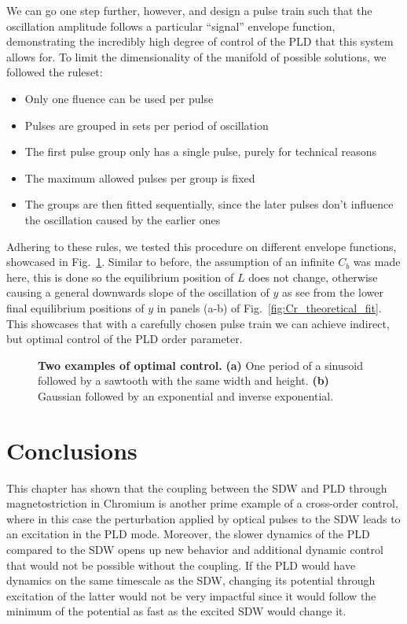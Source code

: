 We can go one step further, however, and design a pulse train such that the oscillation amplitude follows a particular ``signal'' envelope function, demonstrating the incredibly high degree of control of the PLD that this system allows for.  
To limit the dimensionality of the manifold of possible solutions, we followed the ruleset:
\begin{itemize}
	\item Only one fluence can be used per pulse 
	\item Pulses are grouped in sets per period of oscillation
	\item The first pulse group only has a single pulse, purely for technical reasons
	\item The maximum allowed pulses per group is fixed
	\item The groups are then fitted sequentially, since the later pulses don't influence the oscillation caused by the earlier ones
\end{itemize}
Adhering to these rules, we tested this procedure on different envelope functions, showcased in Fig.~\ref{fig:Cr_control}.
Similar to before, the assumption of an infinite $C_b$ was made here, this is done so the equilibrium position of $L$ does not change, otherwise causing a general downwards slope of the oscillation of $y$ as see from the lower final equilibrium positions of $y$ in panels (a-b) of Fig.~\ref{fig:Cr_theoretical_fit}.
This showcases that with a carefully chosen pulse train we can achieve indirect, but optimal control of the PLD order parameter.
\begin{figure}
	\caption{\label{fig:Cr_control} {\bf Two examples of optimal control.} {\bf (a)} One period of a sinusoid followed by a sawtooth with the same width and height. {\bf (b)} Gaussian followed by an exponential and inverse exponential.}
\end{figure}

\section{Conclusions}
This chapter has shown that the coupling between the SDW and PLD through magnetostriction in Chromium is another prime example of a cross-order control, where in this case the perturbation applied by optical pulses to the SDW leads to an excitation in the PLD mode.
Moreover, the slower dynamics of the PLD compared to the SDW opens up new behavior and additional dynamic control that would not be possible without the coupling.
If the PLD would have dynamics on the same timescale as the SDW, changing its potential through excitation of the latter would not be very impactful since it would follow the minimum of the potential as fast as the excited SDW would change it.

